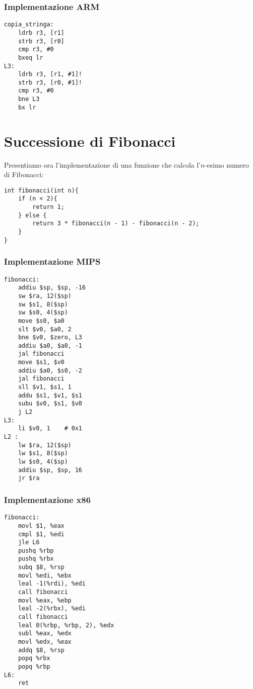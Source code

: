 \documentclass[class=book, crop=false, oneside]{standalone}
\begin{document}
\subsubsection{Implementazione ARM}

\begin{verbatim}
copia_stringa:
	ldrb r3, [r1]
	strb r3, [r0]
	cmp r3, #0
	bxeq lr
L3:
	ldrb r3, [r1, #1]!
	strb r3, [r0, #1]!
	cmp r3, #0
	bne L3
	bx lr
\end{verbatim}

\section{Successione di Fibonacci}
Presentiamo ora l'implementazione di una funzione che calcola l'\(n\)-esimo numero di Fibonacci:
\begin{verbatim}
int fibonacci(int n){
	if (n < 2){
		return 1;
	} else {
		return 3 * fibonacci(n - 1) - fibonacci(n - 2);
	}
}
\end{verbatim}

\subsubsection{Implementazione MIPS}

\begin{verbatim}
fibonacci:
	addiu $sp, $sp, -16
	sw $ra, 12($sp)
	sw $s1, 8($sp)
	sw $s0, 4($sp)
	move $s0, $a0
	slt $v0, $a0, 2
	bne $v0, $zero, L3
	addiu $a0, $a0, -1
	jal fibonacci
	move $s1, $v0
	addiu $a0, $s0, -2
	jal fibonacci
	sll $v1, $s1, 1
	addu $s1, $v1, $s1
	subu $v0, $s1, $v0
	j L2
L3:
	li $v0, 1	 # 0x1
L2 :
	lw $ra, 12($sp)
	lw $s1, 8($sp)
	lw $s0, 4($sp)
	addiu $sp, $sp, 16
	jr $ra
\end{verbatim}

\subsubsection{Implementazione x86}

\begin{verbatim}
fibonacci:
	movl $1, %eax
	cmpl $1, %edi
	jle L6
	pushq %rbp
	pushq %rbx
	subq $8, %rsp
	movl %edi, %ebx
	leal -1(%rdi), %edi
	call fibonacci
	movl %eax, %ebp
	leal -2(%rbx), %edi
	call fibonacci
	leal 0(%rbp, %rbp, 2), %edx
	subl %eax, %edx
	movl %edx, %eax
	addq $8, %rsp
	popq %rbx
	popq %rbp
L6:
	ret
\end{verbatim}
\end{document}
